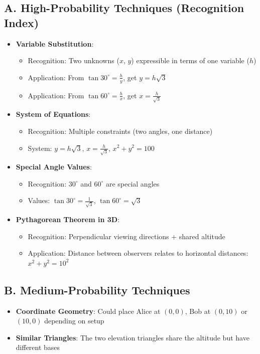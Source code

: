 \documentclass[12pt]{article}
\begin{document}
\begin{conversionbox}
\subsection*{A. High-Probability Techniques (Recognition Index)}
\begin{itemize}[leftmargin=*]
    \item \textbf{Variable Substitution}: 
    \begin{itemize}
        \item Recognition: Two unknowns ($x$, $y$) expressible in terms of one variable ($h$)
        \item Application: From $\tan 30^\circ = \frac{h}{y}$, get $y = h\sqrt{3}$
        \item Application: From $\tan 60^\circ = \frac{h}{x}$, get $x = \frac{h}{\sqrt{3}}$
    \end{itemize}
    \item \textbf{System of Equations}:
    \begin{itemize}
        \item Recognition: Multiple constraints (two angles, one distance)
        \item System: $y = h\sqrt{3}$, $x = \frac{h}{\sqrt{3}}$, $x^2 + y^2 = 100$
    \end{itemize}
    \item \textbf{Special Angle Values}:
    \begin{itemize}
        \item Recognition: $30^\circ$ and $60^\circ$ are special angles
        \item Values: $\tan 30^\circ = \frac{1}{\sqrt{3}}$, $\tan 60^\circ = \sqrt{3}$
    \end{itemize}
    \item \textbf{Pythagorean Theorem in 3D}:
    \begin{itemize}
        \item Recognition: Perpendicular viewing directions + shared altitude
        \item Application: Distance between observers relates to horizontal distances: $x^2 + y^2 = 10^2$
    \end{itemize}
\end{itemize}

\subsection*{B. Medium-Probability Techniques}
\begin{itemize}[leftmargin=*]
    \item \textbf{Coordinate Geometry}: Could place Alice at $(0,0)$, Bob at $(0,10)$ or $(10,0)$ depending on setup
    \item \textbf{Similar Triangles}: The two elevation triangles share the altitude but have different bases
\end{itemize}


\end{conversionbox}
\end{document}
